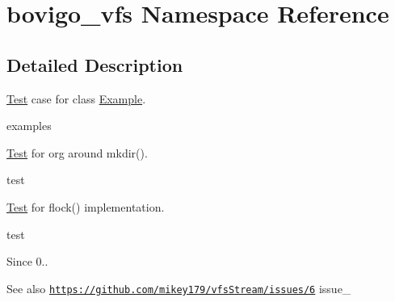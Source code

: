 \hypertarget{namespacebovigo__vfs}{}\section{bovigo\+\_\+vfs Namespace Reference}
\label{namespacebovigo__vfs}


\subsection{Detailed Description}
\mbox{\hyperlink{class_test}{Test}} case for class \mbox{\hyperlink{class_example}{Example}}.

examples

\mbox{\hyperlink{class_test}{Test}} for org around mkdir().

test

\mbox{\hyperlink{class_test}{Test}} for flock() implementation.

test \begin{DoxySince}{Since}
0.. 
\end{DoxySince}
\begin{DoxySeeAlso}{See also}
\href{https://github.com/mikey179/vfsStream/issues/6}{\tt https\+://github.\+com/mikey179/vfs\+Stream/issues/6}  issue\+\_ 
\end{DoxySeeAlso}
